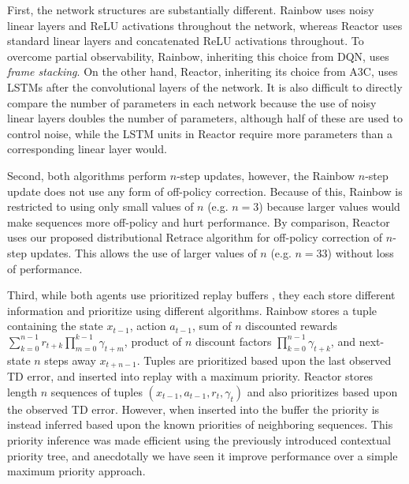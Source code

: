 \documentclass{article}
\begin{document}
First, the network structures are substantially different. Rainbow uses noisy 
linear layers and ReLU activations throughout the network, whereas Reactor uses 
standard linear layers and concatenated ReLU activations throughout. To overcome 
partial observability, Rainbow, inheriting this choice from DQN, uses 
\textit{frame stacking}. On the other hand, Reactor, inheriting its choice from 
A3C, uses LSTMs after the convolutional layers of the network. It is also 
difficult to directly compare the number of parameters in each network because 
the use of noisy linear layers doubles the number of parameters, although half 
of these are used to control noise, while the LSTM units in Reactor require more 
parameters than a corresponding linear layer would.

Second, both algorithms perform $n$-step updates, however, the Rainbow $n$-step 
update does not use any form of off-policy correction. Because of this, Rainbow 
is restricted to using only small values of $n$ (e.g. $n = 3$) because larger 
values would make sequences more off-policy and hurt performance. By comparison, 
Reactor uses our proposed distributional Retrace algorithm for off-policy 
correction of $n$-step updates. This allows the use of larger values of $n$ 
(e.g. $n = 33$) without loss of performance.

Third, while both agents use prioritized replay buffers 
\citep{schaul16prioritized}, they each store different information and 
prioritize using different algorithms. Rainbow stores a tuple containing the 
state $x_{t-1}$, action $a_{t-1}$, sum of $n$ discounted rewards 
$\sum_{k=0}^{n-1} r_{t+k} \prod_{m=0}^{k-1} \gamma_{t+m}$, product of $n$ 
discount factors $\prod_{k=0}^{n-1} \gamma_{t+k}$, and next-state $n$ steps away 
$x_{t+n-1}$. Tuples are prioritized based upon the last observed TD error, and 
inserted into replay with a maximum priority. Reactor stores length $n$ 
sequences of tuples $(x_{t-1}, a_{t-1}, r_t, \gamma_t)$ and also prioritizes 
based upon the observed TD error. However, when inserted into the buffer the 
priority is instead inferred based upon the known priorities of neighboring 
sequences. This priority inference was made efficient using the previously 
introduced contextual priority tree, and anecdotally we have seen it improve 
performance over a simple maximum priority approach.
\end{document}
